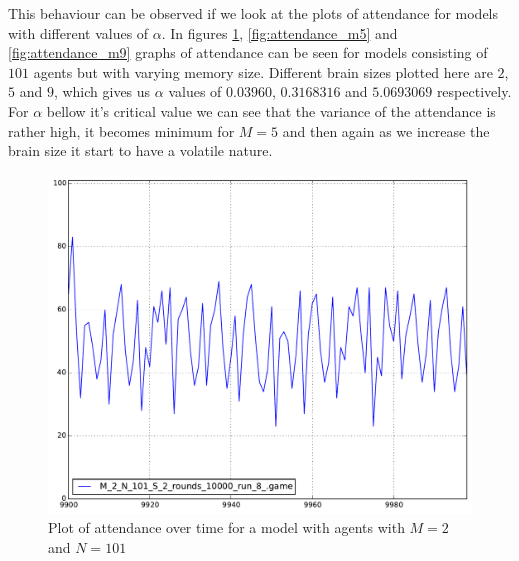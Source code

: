 This behaviour can be observed if we look at the plots of attendance for models with different values of $\alpha$. In figures \ref{fig:attendance_m2}, \ref{fig:attendance_m5} and \ref{fig:attendance_m9} graphs of attendance can be seen for models consisting of $101$ agents but with varying memory size. Different brain sizes plotted here are $2$, $5$ and $9$, which gives us $\alpha$ values of $0.03960$, $0.3168316$ and $5.0693069$ respectively. For $\alpha$ bellow it's critical value we can see that the variance of the attendance is rather high, it becomes minimum for $M=5$ and then again as we increase the brain size it start to have a volatile nature.

\begin{figure}[h]
\begin{center}
\includegraphics[scale=0.4]{images/minority/attendance_m2_n101.pdf}
\caption{Plot of attendance over time for a model with agents with $M=2$ and $N=101$}
\label{fig:attendance_m2}
\end{center}
\end{figure}

